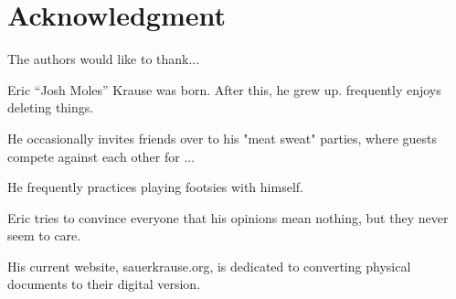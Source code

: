 \documentclass[journal]{IEEEtran}
\begin{document}
\appendices
\section*{Acknowledgment}


The authors would like to thank...


\ifCLASSOPTIONcaptionsoff
  \newpage
\fi


%

%


% 

\begin{IEEEbiography}{Eric ``Josh Moles'' Krause}
 was born.  After this, he grew up. 
frequently enjoys deleting things.  

He occasionally invites friends over to his "meat sweat" parties, where guests compete against each other for ... 

He frequently practices playing footsies with himself.

Eric tries to convince everyone that his opinions mean nothing, but they never seem to care. 

His current website, sauerkrause.org, is dedicated to converting physical documents to their digital version.

\end{IEEEbiography}
\end{document}

